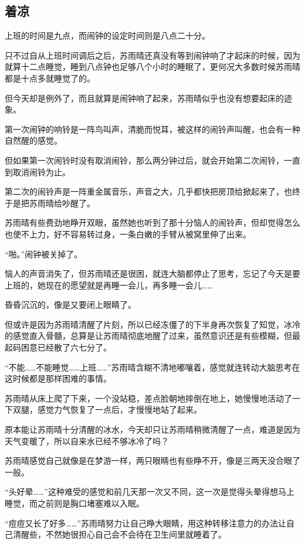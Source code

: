 \subsection{着凉}

上班的时间是九点，而闹钟的设定时间则是八点二十分。

只不过自从上班时间调后之后，苏雨晴还真没有等到闹钟响了才起床的时候，因为就算十二点睡觉，睡到八点钟也足够八个小时的睡眠了，更何况大多数时候苏雨晴都是十点多就睡觉了的。

但今天却是例外了，而且就算是闹钟响了起来，苏雨晴似乎也没有想要起床的迹象。

第一次闹钟的响铃是一阵鸟叫声，清脆而悦耳，被这样的闹铃声叫醒，也会有一种自然醒的感觉。

但如果第一次闹铃时没有取消闹铃，那么两分钟过后，就会开始第二次闹铃，一直到取消闹铃为止。

第二次的闹铃声是一阵重金属音乐，声音之大，几乎都快把房顶给掀起来了，也终于是把苏雨晴给吵醒了。

苏雨晴有些费劲地睁开双眼，虽然她也听到了那十分恼人的闹铃声，但却觉得怎么也使不上力，好不容易转过身，一条白嫩的手臂从被窝里伸了出来。

“啪。”闹钟被关掉了。

恼人的声音消失了，但苏雨晴还是很困，就连大脑都停止了思考，忘记了今天是要上班的，她现在的愿望就是再睡一会儿，再多睡一会儿……

昏昏沉沉的，像是又要闭上眼睛了。

但或许是因为苏雨晴清醒了片刻，所以已经冻僵了的下半身再次恢复了知觉，冰冷的感觉直入骨髓，总算是让苏雨晴彻底地醒了过来，虽然意识还是有些模糊，但最起码困意已经散了六七分了。

“不能……不能睡觉……上班……”苏雨晴含糊不清地嘟嚷着，感觉就连转动大脑思考在这时候都是那样困难的事情。

苏雨晴从床上爬了下来，一个没站稳，差点脸朝地摔倒在地上，她慢慢地活动了一下双腿，感觉力气恢复了一点后，才慢慢地站了起来。

原本能让苏雨晴十分清醒的冰水，今天却只让苏雨晴稍微清醒了一点，难道是因为天气变暖了，所以自来水已经不够冰冷了吗？

苏雨晴感觉自己就像是在梦游一样，两只眼睛也有些睁不开，像是三两天没合眼了一般。

“头好晕……”这种难受的感觉和前几天那一次又不同，这一次是觉得头晕得想马上睡觉，而之前则是胸口堵塞难以入眠。

“痘痘又长了好多……”苏雨晴努力让自己睁大眼睛，用这种转移注意力的办法让自己清醒些，不然她很担心自己会不会待在卫生间里就睡着了。

